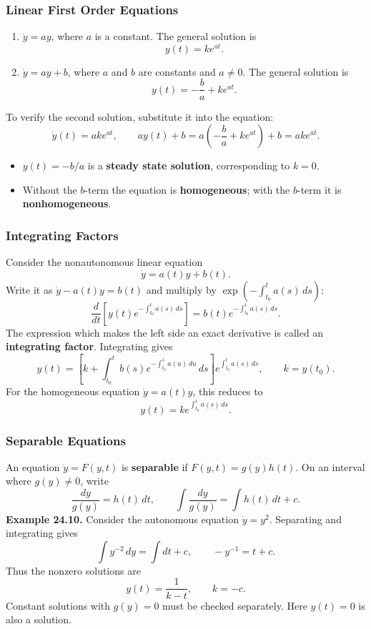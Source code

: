 \documentclass[9pt,aspectratio=169]{beamer}
\begin{document}
\begin{frame}
    \frametitle{Linear First Order Equations}
    \begin{enumerate}
        \item $\dot y=ay$, where $a$ is a constant. The general solution is
        \[
            y(t)=ke^{at}.
        \]
        \item $\dot y=ay+b$, where $a$ and $b$ are constants and $a\neq0$.
        The general solution is
        \[
            y(t)=-\frac{b}{a}+ke^{at}.
        \]
    \end{enumerate}
    To verify the second solution, substitute it into the equation:
    \[
        \dot y(t)=ake^{at},\qquad
        ay(t)+b=a\left(-\frac{b}{a}+ke^{at}\right)+b=ake^{at}.
    \]
    \begin{itemize}
        \item $y(t)=-b/a$ is a \textbf{steady state solution},
        corresponding to $k=0$.
        \item Without the $b$-term the equation is \textbf{homogeneous};
        with the $b$-term it is \textbf{nonhomogeneous}.
    \end{itemize}
\end{frame}

\begin{frame}
    \frametitle{Integrating Factors}
    Consider the nonautonomous linear equation
    \[
        \dot y=a(t)y+b(t).
    \]
    Write it as $\dot y-a(t)y=b(t)$ and multiply by
    $\exp\left(-\int_{t_0}^t a(s)\,ds\right)$:
    \[
        \frac{d}{dt}\left[y(t)e^{-\int_{t_0}^t a(s)\,ds}\right]
        =b(t)e^{-\int_{t_0}^t a(s)\,ds}.
    \]
    The expression which makes the left side an exact derivative is
    called an \textbf{integrating factor}. Integrating gives
    \[
        y(t)=\left[k+\int_{t_0}^t
        b(s)e^{-\int_{t_0}^s a(u)\,du}\,ds\right]
        e^{\int_{t_0}^t a(s)\,ds},\qquad k=y(t_0).
    \]
    For the homogeneous equation $\dot y=a(t)y$, this reduces to
    \[
        y(t)=ke^{\int_{t_0}^t a(s)\,ds}.
    \]
\end{frame}

\begin{frame}
    \frametitle{Separable Equations}
    An equation $\dot y=F(y,t)$ is \textbf{separable} if
    $F(y,t)=g(y)h(t)$. On an interval where $g(y)\neq0$, write
    \[
        \frac{dy}{g(y)}=h(t)\,dt,\qquad
        \int\frac{dy}{g(y)}=\int h(t)\,dt+c.
    \]
    \medskip
    \textbf{Example 24.10.} Consider the autonomous equation
    $\dot y=y^2$. Separating and integrating gives
    \[
        \int y^{-2}\,dy=\int dt+c,\qquad
        -y^{-1}=t+c.
    \]
    Thus the nonzero solutions are
    \[
        y(t)=\frac{1}{k-t},\qquad k=-c.
    \]
    Constant solutions with $g(y)=0$ must be checked separately. Here
    $y(t)=0$ is also a solution.
\end{frame}
\end{document}
